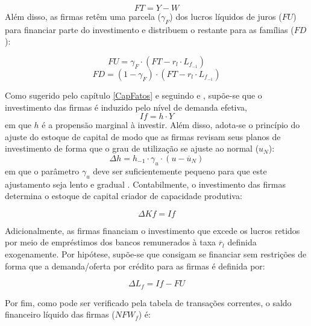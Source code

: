 \begin{equation}
    FT = Y - W
\end{equation}
Além disso, as firmas retêm uma parcela ($\gamma_F$) dos lucros líquidos de juros ($FU$) para financiar parte do investimento e distribuem o restante para as famílias ($FD$):

\begin{equation}
    FU = \gamma_F\cdot (FT - r_l\cdot L_{f_{-1}})
\end{equation}
\begin{equation}
    FD = (1-\gamma_F)\cdot (FT - r_l\cdot L_{f_{-1}})
\end{equation}

Como sugerido pelo capítulo \ref{CapFatos} e seguindo \textcite{serrano_long_1995} e \textcite{serrano_sraffian_2017}, supõe-se que o investimento das firmas é induzido pelo nível de demanda efetiva,
\begin{equation}
\label{_If}
    If = h\cdot Y
\end{equation}
em que $h$ é a propensão marginal à investir. Além disso, adota-se o princípio do ajuste do estoque de capital de modo que as firmas revisam seus planos de investimento de forma que o grau de utilização se ajuste ao normal ($u_N$):
\begin{equation}
\label{_h}
    \Delta h = h_{-1}\cdot \gamma_u\cdot (u - \overline{u}_N)
\end{equation}
em que o parâmetro $\gamma_u$ deve ser suficientemente pequeno para que este ajustamento seja lento e gradual \cite[p.~271]{freitas_growth_2015}. Contabilmente, o investimento das firmas determina o estoque de capital criador de capacidade produtiva:

\begin{equation}
    \Delta Kf = If
\end{equation}

Adicionalmente, as firmas financiam o investimento que excede os lucros retidos por meio de empréstimos dos bancos remunerados à taxa $\overline r_l$ definida exogenamente. Por hipótese, supõe-se que consigam se financiar sem restrições de forma que a demanda/oferta por crédito para as firmas é definida por:

\begin{equation}
    \Delta L_f = If - FU
\end{equation}

Por fim, como pode ser verificado pela tabela de transações correntes, o saldo financeiro líquido das firmas ($NFW_f$) é:

